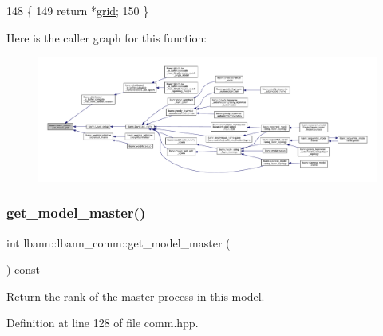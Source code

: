 \begin{DoxyCode}
148                                 \{
149     \textcolor{keywordflow}{return} *\hyperlink{classlbann_1_1lbann__comm_a29fb31be115db3225b145f250a7778d9}{grid};
150   \}
\end{DoxyCode}
Here is the caller graph for this function\+:\nopagebreak
\begin{figure}[H]
\begin{center}
\leavevmode
\includegraphics[width=350pt]{classlbann_1_1lbann__comm_a483bf8a72d44a0e83da45f3d47bd20d4_icgraph}
\end{center}
\end{figure}
\mbox{\label{classlbann_1_1lbann__comm_a96d8d7a0ff8ee1511f8c8b8fa92628af}} 
\subsubsection{\texorpdfstring{get\+\_\+model\+\_\+master()}{get\_model\_master()}}
{\footnotesize\ttfamily int lbann\+::lbann\+\_\+comm\+::get\+\_\+model\+\_\+master (\begin{DoxyParamCaption}{ }\end{DoxyParamCaption}) const\hspace{0.3cm}{\ttfamily [inline]}}

Return the rank of the master process in this model. 

Definition at line 128 of file comm.\+hpp.


